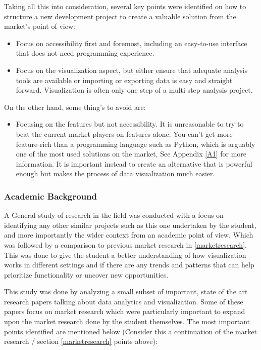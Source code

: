 Taking all this into consideration, several key points were identified on how to structure a new development project to create a valuable solution from the market’s point of view:

\begin{itemize}
    \item Focus on accessibility first and foremost, including an easy-to-use interface that does not need programming experience.
    \item Focus on the visualization aspect, but either ensure that adequate analysis tools are available or importing or exporting data is easy and straight forward. Visualization is often only one step of a multi-step analysis project.
\end{itemize}

On the other hand, some thing’s to avoid are:

\begin{itemize}
    \item Focusing on the features but not accessibility. It is unreasonable to try to beat the current market players on features alone. You can’t get more feature-rich than a programming language such as Python, which is arguably one of the most used solutions on the market, See Appendix \ref{A1} for more information. It is important instead to create an alternative that is powerful enough but makes the process of data visualization much easier.
\end{itemize}

\subsubsection{Academic Background} \label{academicbackground}
A General study of research in the field was conducted with a focus on identifying any other similar projects such as this one undertaken by the student, and more importantly the wider context from an academic point of view. Which was followed by a comparison to previous market research in \ref{marketresearch}. This was done to give the student a better understanding of how visualization works in different settings and if there are any trends and patterns that can help prioritize functionality or uncover new opportunities.

This study was done by analyzing a small subset of important, state of the art research papers talking about data analytics and visualization. Some of these papers focus on market research which were particularly important to expand upon the market research done by the student themselves. The most important points identified are mentioned below (Consider this a continuation of the market research / section \ref{marketresearch} points above):

